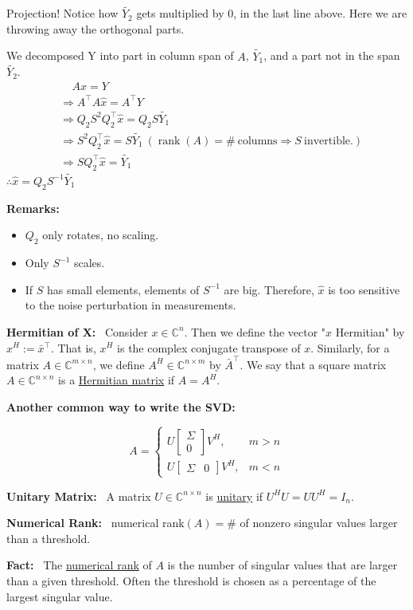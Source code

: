 \documentclass[letterpaper]{article}
\begin{document}
\noindent Projection! Notice how $\tilde{Y_2}$ gets multiplied by $0$, in the last line above.  Here we are throwing away the orthogonal parts.

\noindent We decomposed Y into part in column span of $A$, $\tilde{Y_1}$, and a part not in the span $\tilde{Y_2}$.
\begin{align*}
    &\ \ \ \ \ Ax=Y\\
    &\Rightarrow A^\top A \hat{x} = A^\top Y\\
    &\Rightarrow Q_2 S^2 Q_2^\top \hat{x} = Q_2 S \tilde{Y_1}\\
    &\Rightarrow S^2 Q_2^\top \hat{x} = S \tilde{Y_1}\ (\operatorname{rank}(A) = \#\ \text{columns} \Rightarrow S ~ \text{invertible.})\\
    &\Rightarrow S Q_2^\top \hat{x} = \tilde{Y_1}
\end{align*}
$\therefore \hat{x} = Q_2 S^{-1} \tilde{Y_1}$

\noindent \textbf{Remarks:}
    \begin{itemize}
        \setlength{\itemsep}{.4cm}
        \item $Q_2$ only rotates, no scaling.
        \item Only $S^{-1}$ scales.
        \item If $S$ has small elements, elements of $S^{-1}$ are big. Therefore, $\hat{x}$ is too sensitive to the noise perturbation in measurements.
    \end{itemize}

\noindent \textbf{Hermitian of X:}~ Consider $x\in \mathbb{C}^n$. Then we define the vector "$x$ Hermitian" by $x^H:={\bar{x}}^\top$. That is, $x^H$ is the complex conjugate transpose of $x$. Similarly, for a matrix $A\in\mathbb{C}^{m\times n}$, we define $A^H\in\mathbb{C}^{n\times m}$ by ${\bar{A}}^\top$. We say that a square matrix $A\in\mathbb{C}^{n\times n}$ is a \underline{Hermitian matrix} if $A=A^H$.

\newpage

\noindent \textbf{Another common way to write the SVD:}

   $$A = \left\{
     \begin{array}{lr}
       U \left[ \begin{array}{c} \Sigma \\ 0 \end{array} \right] V^H, & m > n\\
       U \left[ \begin{array}{cc} \Sigma & 0 \end{array} \right] V^H, & m < n
     \end{array}
   \right.$$

\noindent \textbf{Unitary Matrix:}~ A matrix $U\in\mathbb{C}^{n\times n}$ is \underline{unitary} if $U^HU=UU^H=I_n$.

\noindent \textbf{Numerical Rank:}~ numerical rank$(A)=\#$ of nonzero singular values larger than a threshold.

\noindent \textbf{Fact:}~ The \underline{numerical rank} of $A$ is the number of singular values that are larger than a given threshold. Often the threshold is chosen as a percentage of the largest singular value.
\end{document}

